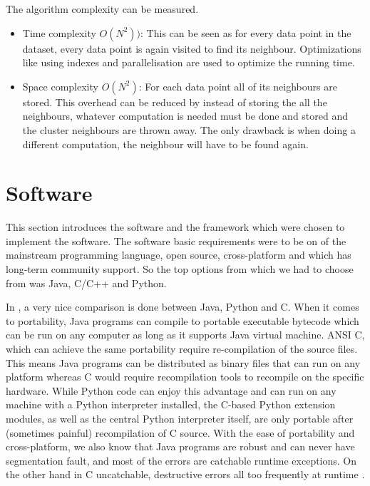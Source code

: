 The algorithm complexity can be measured. 
\begin{itemize}
    \item Time complexity \(O(N^2))\): This can be seen as for every data point in the dataset, every data point is again visited to find its neighbour. Optimizations like using indexes and parallelisation are used to optimize the running time.
    \item Space complexity \(O(N^2)\): For each data point all of its neighbours are stored. This overhead can be reduced by instead of storing the all the neighbours, whatever computation is needed must be done and stored and the cluster neighbours are thrown away. The only drawback is when doing a different computation, the neighbour will have to be found again. 
\end{itemize}

\section{Software}

This section introduces the software and the framework which were chosen to implement the software. The software basic requirements were to be on of the mainstream programming language, open source, cross-platform and which has long-term community support. So the top options from which we had to choose from was Java, C/C++ and Python.

In \cite{hugunin1997Python}, a very nice comparison is done between Java, Python and C. When it comes to portability, Java programs can compile to portable executable bytecode which can be run on any computer as long as it supports Java virtual machine. ANSI C, which can achieve the same portability require re-compilation of the source files. This means Java programs can be distributed as binary files that can run on any platform whereas C would require recompilation tools to recompile on the specific hardware. While Python code can enjoy this advantage and can run on any machine with a Python interpreter installed, the C-based Python extension modules, as well as the central Python interpreter itself, are only portable after (sometimes painful) recompilation of C source. With the ease of portability and cross-platform, we also know that Java programs are robust and can never have segmentation fault, and most of the errors are catchable runtime exceptions. On the other hand in C uncatchable, destructive errors all too frequently at runtime \cite{hugunin1997Python}.

